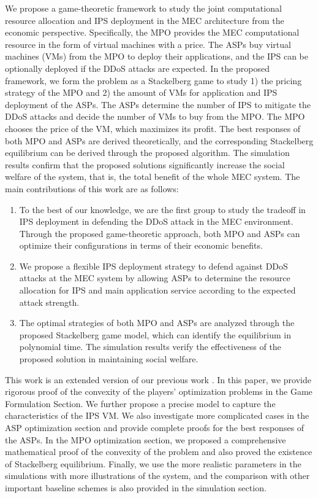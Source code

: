 \documentclass[10pt,journal, compsoc]{IEEEtran}
\begin{document}
We propose a game-theoretic framework to study the joint computational resource allocation and IPS deployment in the MEC architecture from the economic perspective. Specifically, the MPO provides the MEC computational resource in the form of virtual machines with a price. The ASPs buy virtual machines (VMs) from the MPO to deploy their applications, and the IPS can be optionally deployed if the DDoS attacks are expected. In the proposed framework, we form the problem as a Stackelberg game to study 1) the pricing strategy of the MPO and 2) the amount of VMs for application and IPS deployment of the ASPs. The ASPs determine the number of IPS to mitigate the DDoS attacks and decide the number of VMs to buy from the MPO. The MPO chooses the price of the VM, which maximizes its profit. The best responses of both MPO and ASPs are derived theoretically, and the corresponding Stackelberg equilibrium can be derived through the proposed algorithm. The simulation results confirm that the proposed solutions significantly increase the social welfare of the system, that is, the total benefit of the whole MEC system.
The main contributions of this work are as follows:
\begin{enumerate}
    \item To the best of our knowledge, we are the first group to study the tradeoff in IPS deployment in defending the DDoS attack in the MEC environment. Through the proposed game-theoretic approach, both MPO and ASPs can optimize their configurations in terms of their economic benefits.
    \item We propose a flexible IPS deployment strategy to defend against DDoS attacks at the MEC system by allowing ASPs to determine the resource allocation for IPS and main application service according to the expected attack strength. 
    \item The optimal strategies of both MPO and ASPs are analyzed through the proposed Stackelberg game model, which can identify the equilibrium in polynomial time. The simulation results verify the effectiveness of the proposed solution in maintaining social welfare. 
\end{enumerate}

This work is an extended version of our previous work \cite{Chang2}. In this paper, we provide rigorous proof of the convexity of the players' optimization problems in the Game Formulation Section. We further propose a precise model to capture the characteristics of the IPS VM. We  also investigate more complicated cases in the ASP optimization section and provide complete proofs for the best responses of the ASPs. In the MPO optimization section, we proposed a comprehensive mathematical proof of the convexity of the problem and also proved the existence of Stackelberg equilibrium. Finally, we use the more realistic parameters in the simulations with more illustrations of the system, and the comparison with other important baseline schemes is also provided in the simulation section.
\end{document}
